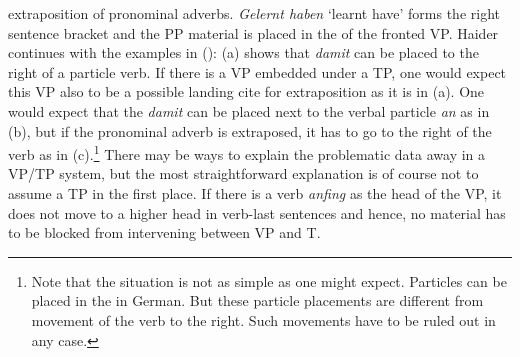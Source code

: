   extraposition of pronominal adverbs. \emph{Gelernt haben} `learnt have' forms the right sentence
  bracket and the PP material is placed in the \nf of the fronted VP.
Haider continues with the examples in ():
\eal
{}
\zl
(a) shows that \emph{damit} can be placed to the right of a particle verb. If there is a VP
embedded under a TP, one would expect this VP also to be a possible landing cite 
for extraposition as it is in (a). One would expect that the \emph{damit} can be placed next
to the verbal particle \emph{an} as in (b), but if the pronominal adverb is extraposed, it
has to go to the right of the verb as in (c).\footnote{
Note that the situation is not as simple as one might expect. Particles can be placed in the
\mf in German. But these particle placements are different from movement of the verb to the
right. Such movements have to be ruled out in any case.%
} There may be ways to explain the problematic data away in a
VP/TP system, but the most straightforward explanation is of course not to assume a TP in the first
place. If there is a verb \emph{anfing} as the head of the VP, it does not move to a higher head in
verb-last sentences and hence, no material has to be blocked from intervening between VP and T.


\clearpage




